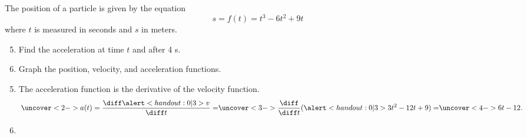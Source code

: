 \begin{frame}[t]
\begin{example}[Example 1, p. 171]
The position of a particle is given by the equation
\abovedisplayskip=0pt
\belowdisplayskip=0pt
\[
s = f(t) = t^3 - 6t^2 + 9t
\]
where $t$ is measured in seconds and $s$ in meters.
\begin{enumerate}
\setcounter{enumi}{4}
\item<1-| alert@2-5>  Find the acceleration at time $t$ and after 4 s.
\item<1-| alert@6->  Graph the position, velocity, and acceleration functions. 
\end{enumerate}
\begin{enumerate}
\setcounter{enumi}{4}
\item<2->  The acceleration function is the derivative of the velocity function.
\[
\uncover<2->{%
a(t) = \frac{\diff \alert<handout:0| 3>{v}}{\diff t} = %
}%
\uncover<3->{%
\frac{\diff}{\diff t} (\alert<handout:0| 3>{3t^2-12t + 9}) = %
}%
\uncover<4->{%
6t - 12.
}%
\]
%
\item<6->  
\begin{center}
\ %
\end{center}
\end{enumerate}
\end{example}
\end{frame}



